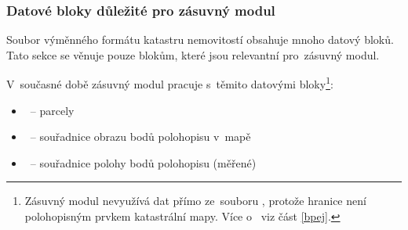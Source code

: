 \subsubsection{Datové bloky důležité pro zásuvný modul}
\label{datove_bloky_zasuvny_modul}

Soubor výměnného formátu katastru nemovitostí obsahuje mnoho datový
bloků. Tato sekce se věnuje pouze blokům, které jsou relevantní
pro~zásuvný modul.

V~současné době zásuvný modul pracuje s~těmito datovými
bloky\footnote{Zásuvný modul nevyužívá dat  přímo ze~souboru
, protože hranice  není polohopisným prvkem
katastrální mapy. Více o~ viz část \ref{bpej}.}:

	\begin{itemize}[leftmargin=1.5cm, noitemsep]
		\item \texttt{}~– parcely
		\item \texttt{}~– souřadnice obrazu bodů
polohopisu v~mapě
		\item \texttt{}~– souřadnice polohy bodů
polohopisu (měřené)
	\end{itemize}

